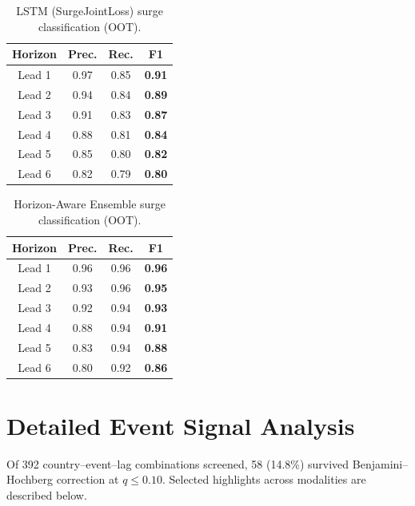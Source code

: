 \documentclass[11pt, a4paper]{article}
\begin{document}
\begin{appendices}
\begin{table}[ht]
  \centering
  \caption{LSTM (SurgeJointLoss) surge classification (OOT).}
  \label{tab:lstm_class}
  \small
  \begin{tabular}{c c c c}
    \toprule
    \textbf{Horizon} & \textbf{Prec.} & \textbf{Rec.} & \textbf{F1} \\
    \midrule
    Lead 1 & 0.97 & 0.85 & \textbf{0.91} \\
    Lead 2 & 0.94 & 0.84 & \textbf{0.89} \\
    Lead 3 & 0.91 & 0.83 & \textbf{0.87} \\
    Lead 4 & 0.88 & 0.81 & \textbf{0.84} \\
    Lead 5 & 0.85 & 0.80 & \textbf{0.82} \\
    Lead 6 & 0.82 & 0.79 & \textbf{0.80} \\
    \bottomrule
  \end{tabular}
\end{table}

\begin{table}[ht]
  \centering
  \caption{Horizon-Aware Ensemble surge classification (OOT).}
  \label{tab:ens_class}
  \small
  \begin{tabular}{c c c c}
    \toprule
    \textbf{Horizon} & \textbf{Prec.} & \textbf{Rec.} & \textbf{F1} \\
    \midrule
    Lead 1 & 0.96 & 0.96 & \textbf{0.96} \\
    Lead 2 & 0.93 & 0.96 & \textbf{0.95} \\
    Lead 3 & 0.92 & 0.94 & \textbf{0.93} \\
    Lead 4 & 0.88 & 0.94 & \textbf{0.91} \\
    Lead 5 & 0.83 & 0.94 & \textbf{0.88} \\
    Lead 6 & 0.80 & 0.92 & \textbf{0.86} \\
    \bottomrule
  \end{tabular}
\end{table}


\section{Detailed Event Signal Analysis}\label{app:events}

Of 392 country--event--lag combinations screened, 58 (14.8\%) survived
Benjamini--Hochberg correction at $q \leq 0.10$.  Selected highlights across
modalities are described below.


\end{appendices}
\end{document}
